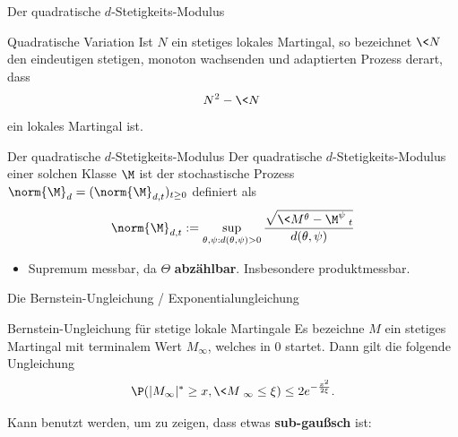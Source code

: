 \begin{frame}{Der quadratische $d$-Stetigkeits-Modulus}
    \begin{definitionblockname}{Quadratische Variation}
        Ist $N$ ein stetiges lokales %
        Martingal, so bezeichnet $\<N\>$ den eindeutigen stetigen, monoton wachsenden und adaptierten Prozess derart, dass \[
N^2 - \<N\>
        \] ein lokales Martingal ist. 
    \end{definitionblockname}
    \begin{definitionblockname}{Der quadratische $d$-Stetigkeits-Modulus}
        Der quadratische $d$-Stetigkeits-Modulus einer solchen Klasse $\M$ ist der stochastische Prozess $\norm{\M}_d = (\norm{\M}_{d,t})_{t \geq 0}$ definiert als 
        \[
\norm{\M}_{d,t}  := \sup_{\theta, \psi: d(\theta, \psi) > 0} \frac{\sqrt{\<M^\theta - \M^\psi\>_t}}{d(\theta, \psi)}
        \]
    \end{definitionblockname}
    \begin{itemize}
        \item Supremum messbar, da $\Theta$ \textbf{abzählbar}. Insbesondere produktmessbar.
    \end{itemize}
\end{frame}

\begin{frame}{Die Bernstein-Ungleichung / Exponentialungleichung}
    \begin{satzblockname}{Bernstein-Ungleichung für stetige lokale Martingale}
        Es bezeichne $M$ ein stetiges Martingal mit terminalem Wert $M_\infty$, welches in $0$ startet. Dann gilt die folgende Ungleichung
        \[
\P(|M_\infty|^* \geq x, \<M\>_\infty \leq \xi) \leq 2e^{-\frac{x^2}{2\xi}}.
        \]
    \end{satzblockname}
    \pause
Kann benutzt werden, um zu zeigen, dass etwas \textbf{sub-gaußsch} ist:
\end{frame}

